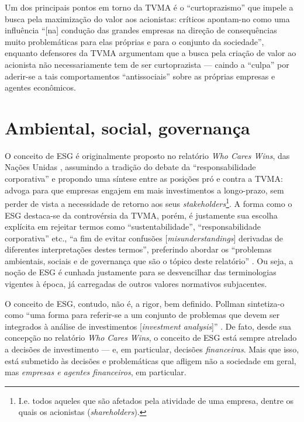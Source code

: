 \documentclass[12pt]{article}
\numberwithin{equation}{section}
\theoremstyle{plain}
\theoremstyle{definition}
\theoremstyle{remark}
\begin{document}
Um dos principais pontos em torno da TVMA é o ``curtoprazismo'' que impele a busca pela maximização do valor aos acionistas: críticos apontam-no como uma influência ``[na] condução das grandes empresas na direção de consequências muito problemáticas para elas próprias e para o conjunto da sociedade'', enquanto defensores da TVMA argumentam que a busca pela criação de valor ao acionista não necessariamente tem de ser curtoprazista --- caindo a ``culpa'' por aderir-se a tais comportamentos ``antissociais'' 
sobre as próprias empresas e agentes econômicos. 

\section{Ambiental, social, governança}
O conceito de ESG é originalmente proposto no relatório \textit{Who Cares Wins}, das Nações Unidas \citeyear{GlobalCompact2004}, assumindo a tradição do debate da ``responsabilidade corporativa'' e propondo uma síntese entre as posições pró e contra a TVMA: advoga para que empresas engajem em mais investimentos a longo-prazo, sem perder de vista a necessidade de retorno aos seus \textit{stakeholders}\footnote{I.e. todos aqueles que são afetados pela atividade de uma empresa, dentre os quais os acionistas (\textit{shareholders}).}. A forma como o ESG destaca-se da controvérsia da TVMA, porém, é justamente sua escolha explícita em rejeitar termos como ``sustentabilidade'', ``responsabilidade corporativa'' etc., ``a fim de evitar confusões [\textit{misunderstandings}] derivadas de diferentes interpretações destes termos'', preferindo abordar os ``problemas ambientais, sociais e de governança que são o tópico deste relatório'' \parencite[p. 1-2]{GlobalCompact2004}. Ou seja, a noção de ESG é cunhada justamente para se desvencilhar das terminologias vigentes à época, já carregadas de outros valores normativos subjacentes.

O conceito de ESG, contudo, não é, a rigor, bem definido. Pollman sintetiza-o como ``uma forma para referir-se a um conjunto de problemas que devem ser integrados à análise de investimentos [\textit{investment analysis}]'' \parencite[p. 21]{Pollman2022}. De fato, desde sua concepção no relatório \textit{Who Cares Wins}, o conceito de ESG está sempre atrelado a decisões de investimento --- e, em particular, decisões \textit{financeiras}. Mais que isso, está submetido às decisões e problemáticas que afligem não a sociedade em geral, mas \textit{empresas e agentes financeiros}, em particular. 
\end{document}
